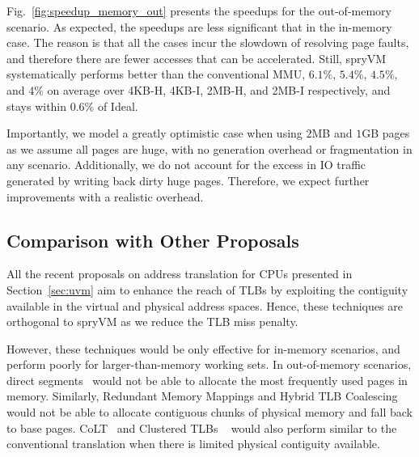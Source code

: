 Fig.~\ref{fig:speedup_memory_out} presents the speedups for the out-of-memory scenario. As expected, the speedups are less significant that in the in-memory case. The reason is that all the cases incur the slowdown of resolving page faults, and therefore there are fewer accesses that can be accelerated. Still, spryVM systematically performs better than the conventional MMU, $6.1\%$, $5.4\%$, $4.5\%$, and $4\%$ on average over 4KB-H, 4KB-I, 2MB-H, and 2MB-I respectively, and stays within 0.6\% of Ideal. 

Importantly, we model a greatly optimistic case when using $2$MB and $1$GB pages as we assume all pages are huge, with no generation overhead or fragmentation in any scenario. Additionally, we do not account for the excess in IO traffic generated by writing back dirty huge pages. Therefore, we expect further improvements with a realistic overhead. 



\subsection{Comparison with Other Proposals}

All the recent proposals on address translation for CPUs presented in Section~\ref{sec:uvm} aim to enhance the reach of TLBs by exploiting the contiguity available in the virtual and physical address spaces. Hence, these techniques are orthogonal to spryVM as we reduce the TLB miss penalty. 

However, these techniques would be only effective for in-memory scenarios, and perform poorly for larger-than-memory working sets. In out-of-memory scenarios, direct segments~\cite{basu:efficient} would not be able to allocate the most frequently used pages in memory. Similarly, Redundant Memory Mappings and Hybrid TLB Coalescing~\cite{karakostas:redundant, park:hybrid} would not be able to allocate contiguous chunks of physical memory and fall back to base pages. CoLT~\cite{pham:colt} and Clustered TLBs ~\cite{pham:increasing} would also perform similar to the conventional translation when there is limited physical contiguity available. 

